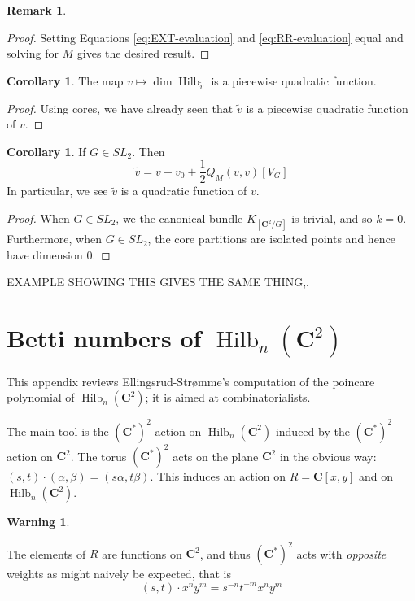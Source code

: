 \documentclass{amsart}[12pt]
\theoremstyle{definition}
\newtheorem{corollary}[dummy]{Corollary}
\newtheorem{remark}[dummy]{Remark}
\newtheorem{warning}[dummy]{Warning}
\newcommand{\C}{\mathbf{C}}
\DeclareMathOperator{\Hilb}{Hilb}
\begin{document}
\begin{remark}
\begin{proof}
Setting Equations \ref{eq:EXT-evaluation} and \ref{eq:RR-evaluation} equal and solving for $M$ gives the desired result.

\end{proof}


\begin{corollary}
The map $v\mapsto \dim\Hilb_{\tilde{v}}$ is a piecewise quadratic function.
\end{corollary}

\begin{proof}
Using cores, we have already seen that $\tilde{v}$ is a piecewise quadratic function of $v$.  
\end{proof}


\begin{corollary}  If $G\in SL_2$. Then
$$\tilde{v}=v-v_0+\frac{1}{2}Q_M(v,v)[V_G]$$
In particular, we see $\tilde{v}$ is a quadratic function of $v$.
\end{corollary}

\begin{proof}
When $G\in SL_2$, we the canonical bundle $K_{[\C^2/G]}$ is trivial, and so $k=0$.  Furthermore, when $G\in SL_2$, the core partitions are isolated points and hence have dimension 0.
\end{proof}


EXAMPLE SHOWING THIS GIVES THE SAME THING,.





\appendix

\section{Betti numbers of $\Hilb_n(\C^2)$}
This appendix reviews Ellingsrud-Str\o mme's computation of the poincare polynomial of $\Hilb_n(\C^2)$; it is aimed at combinatorialists.  

The main tool is the $(\C^*)^2$ action on $\Hilb_n(\C^2)$ induced by the $(\C^*)^2$ action on $\C^2$.  The torus $(\C^*)^2$ acts on the plane $\C^2$ in the obvious way: $(s,t)\cdot (\alpha,\beta)=(s\alpha,t\beta)$.  This induces an action on $R=\C[x,y]$ and on $\Hilb_n(\C^2)$.  

\begin{warning} \label{warning:action-sign}

 The elements of $R$ are functions on $\C^2$, and thus $(\C^*)^2$ acts with \emph{opposite} weights as might naively be expected, that is 
$$(s,t)\cdot x^ny^m=s^{-n}t^{-m}x^ny^m$$
\end{warning}





\end{remark}
\end{document}
